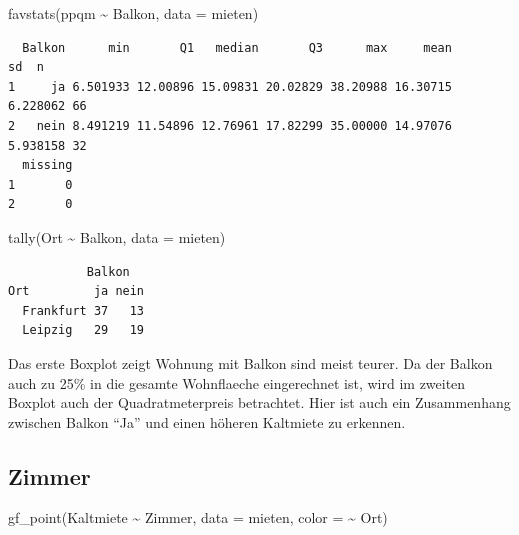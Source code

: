 \documentclass[
  a4paper,
  DIV=11]{scrartcl}
\newenvironment{Shaded}{\begin{snugshade}}{\end{snugshade}}
\newcommand{\AttributeTok}[1]{\textcolor[rgb]{0.40,0.45,0.13}{#1}}
\newcommand{\FunctionTok}[1]{\textcolor[rgb]{0.28,0.35,0.67}{#1}}
\newcommand{\NormalTok}[1]{\textcolor[rgb]{0.00,0.23,0.31}{#1}}
\newcommand{\SpecialCharTok}[1]{\textcolor[rgb]{0.37,0.37,0.37}{#1}}
\begin{document}
\begin{Shaded}
\begin{Highlighting}[]
\FunctionTok{favstats}\NormalTok{(ppqm }\SpecialCharTok{\textasciitilde{}}\NormalTok{ Balkon, }\AttributeTok{data =}\NormalTok{ mieten)}
\end{Highlighting}
\end{Shaded}

\begin{verbatim}
  Balkon      min       Q1   median       Q3      max     mean       sd  n
1     ja 6.501933 12.00896 15.09831 20.02829 38.20988 16.30715 6.228062 66
2   nein 8.491219 11.54896 12.76961 17.82299 35.00000 14.97076 5.938158 32
  missing
1       0
2       0
\end{verbatim}

\begin{Shaded}
\begin{Highlighting}[]
\FunctionTok{tally}\NormalTok{(Ort }\SpecialCharTok{\textasciitilde{}}\NormalTok{ Balkon, }\AttributeTok{data =}\NormalTok{ mieten)}
\end{Highlighting}
\end{Shaded}

\begin{verbatim}
           Balkon
Ort         ja nein
  Frankfurt 37   13
  Leipzig   29   19
\end{verbatim}

Das erste Boxplot zeigt Wohnung mit Balkon sind meist teurer. Da der
Balkon auch zu 25\% in die gesamte Wohnflaeche eingerechnet ist, wird im
zweiten Boxplot auch der Quadratmeterpreis betrachtet. Hier ist auch ein
Zusammenhang zwischen Balkon ``Ja'' und einen höheren Kaltmiete zu
erkennen.

\hypertarget{zimmer}{%
\subsection{Zimmer}\label{zimmer}}

\begin{Shaded}
\begin{Highlighting}[]
\FunctionTok{gf\_point}\NormalTok{(Kaltmiete }\SpecialCharTok{\textasciitilde{}}\NormalTok{ Zimmer, }\AttributeTok{data =}\NormalTok{ mieten, }\AttributeTok{color =} \SpecialCharTok{\textasciitilde{}}\NormalTok{ Ort)}
\end{Highlighting}
\end{Shaded}
\end{document}
